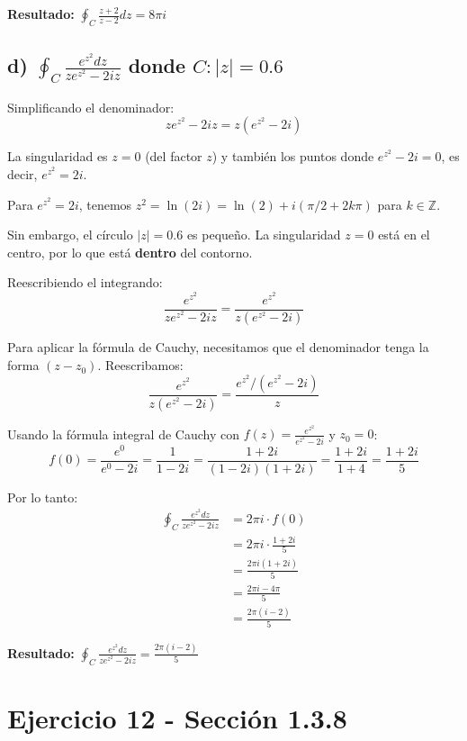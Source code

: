 \documentclass{article}
\begin{document}
\textbf{Resultado:} $\oint_C \frac{z + 2}{z - 2} dz = 8\pi i$

\subsection*{d) $\oint_C \frac{e^{z^2} dz}{z e^{z^2} - 2iz}$ donde $C: |z| = 0.6$}

Simplificando el denominador:
$$z e^{z^2} - 2iz = z(e^{z^2} - 2i)$$

La singularidad es $z = 0$ (del factor $z$) y también los puntos donde $e^{z^2} - 2i = 0$, es decir, $e^{z^2} = 2i$.

Para $e^{z^2} = 2i$, tenemos $z^2 = \ln(2i) = \ln(2) + i(\pi/2 + 2k\pi)$ para $k \in \mathbb{Z}$.

Sin embargo, el círculo $|z| = 0.6$ es pequeño. La singularidad $z = 0$ está en el centro, por lo que está \textbf{dentro} del contorno.

Reescribiendo el integrando:
$$\frac{e^{z^2}}{z e^{z^2} - 2iz} = \frac{e^{z^2}}{z(e^{z^2} - 2i)}$$

Para aplicar la fórmula de Cauchy, necesitamos que el denominador tenga la forma $(z - z_0)$. Reescribamos:
$$\frac{e^{z^2}}{z(e^{z^2} - 2i)} = \frac{e^{z^2}/(e^{z^2} - 2i)}{z}$$

Usando la fórmula integral de Cauchy con $f(z) = \frac{e^{z^2}}{e^{z^2} - 2i}$ y $z_0 = 0$:
$$f(0) = \frac{e^{0}}{e^{0} - 2i} = \frac{1}{1 - 2i} = \frac{1 + 2i}{(1 - 2i)(1 + 2i)} = \frac{1 + 2i}{1 + 4} = \frac{1 + 2i}{5}$$

Por lo tanto:
\begin{align*}
\oint_C \frac{e^{z^2} dz}{z e^{z^2} - 2iz} &= 2\pi i \cdot f(0) \\
                                           &= 2\pi i \cdot \frac{1 + 2i}{5} \\
                                           &= \frac{2\pi i(1 + 2i)}{5} \\
                                           &= \frac{2\pi i - 4\pi}{5} \\
                                           &= \frac{2\pi(i - 2)}{5}
\end{align*}

\textbf{Resultado:} $\oint_C \frac{e^{z^2} dz}{z e^{z^2} - 2iz} = \frac{2\pi(i - 2)}{5}$

\newpage
\section*{Ejercicio 12 - Sección 1.3.8}
\end{document}
